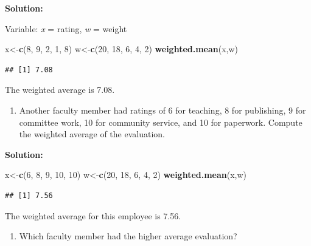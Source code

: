 \documentclass[
]{book}
\newenvironment{Shaded}{\begin{snugshade}}{\end{snugshade}}
\newcommand{\DecValTok}[1]{\textcolor[rgb]{0.00,0.00,0.81}{#1}}
\newcommand{\KeywordTok}[1]{\textcolor[rgb]{0.13,0.29,0.53}{\textbf{#1}}}
\newcommand{\NormalTok}[1]{#1}
\providecommand{\tightlist}{%
  \setlength{\itemsep}{0pt}\setlength{\parskip}{0pt}}
\begin{document}
\textbf{Solution:}

Variable: \emph{x} = rating, \emph{w} = weight

\begin{Shaded}
\begin{Highlighting}[]
\NormalTok{x<-}\KeywordTok{c}\NormalTok{(}\DecValTok{8}\NormalTok{, }\DecValTok{9}\NormalTok{, }\DecValTok{2}\NormalTok{, }\DecValTok{1}\NormalTok{, }\DecValTok{8}\NormalTok{)}
\NormalTok{w<-}\KeywordTok{c}\NormalTok{(}\DecValTok{20}\NormalTok{, }\DecValTok{18}\NormalTok{, }\DecValTok{6}\NormalTok{, }\DecValTok{4}\NormalTok{, }\DecValTok{2}\NormalTok{)}
\KeywordTok{weighted.mean}\NormalTok{(x,w)}
\end{Highlighting}
\end{Shaded}

\begin{verbatim}
## [1] 7.08
\end{verbatim}

The weighted average is 7.08.

\begin{enumerate}
\def\labelenumi{\alph{enumi})}
\setcounter{enumi}{1}
\tightlist
\item
  Another faculty member had ratings of 6 for teaching, 8 for publishing, 9 for committee work, 10 for community service, and 10 for paperwork. Compute the weighted average of the evaluation.
\end{enumerate}

\textbf{Solution:}

\begin{Shaded}
\begin{Highlighting}[]
\NormalTok{x<-}\KeywordTok{c}\NormalTok{(}\DecValTok{6}\NormalTok{, }\DecValTok{8}\NormalTok{, }\DecValTok{9}\NormalTok{, }\DecValTok{10}\NormalTok{, }\DecValTok{10}\NormalTok{)}
\NormalTok{w<-}\KeywordTok{c}\NormalTok{(}\DecValTok{20}\NormalTok{, }\DecValTok{18}\NormalTok{, }\DecValTok{6}\NormalTok{, }\DecValTok{4}\NormalTok{, }\DecValTok{2}\NormalTok{)}
\KeywordTok{weighted.mean}\NormalTok{(x,w)}
\end{Highlighting}
\end{Shaded}

\begin{verbatim}
## [1] 7.56
\end{verbatim}

The weighted average for this employee is 7.56.

\begin{enumerate}
\def\labelenumi{\alph{enumi})}
\setcounter{enumi}{2}
\tightlist
\item
  Which faculty member had the higher average evaluation?
\end{enumerate}
\end{document}
